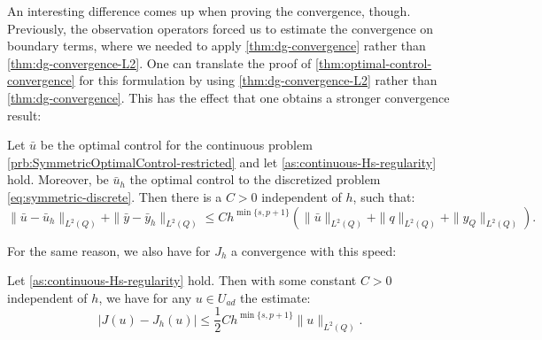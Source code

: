 \documentclass[../thesis.tex]{subfiles}
\begin{document}
An interesting difference comes up when proving the convergence, though. Previously, the observation operators forced us to estimate the convergence on boundary terms, where we needed to apply \cref{thm:dg-convergence} rather than \cref{thm:dg-convergence-L2}. One can translate the proof of \cref{thm:optimal-control-convergence} for this formulation by using \cref{thm:dg-convergence-L2} rather than \cref{thm:dg-convergence}.
This has the effect that one obtains a stronger convergence result:
\begin{theorem}
\label{thm:optimal-control-convergence-symm}
Let $\bar{u}$ be the optimal control for the continuous problem \cref{prb:SymmetricOptimalControl-restricted} and let \cref{as:continuous-Hs-regularity} hold. Moreover, be $\bar{u}_h$ the optimal control to the discretized problem \cref{eq:symmetric-discrete}.
Then there is a $C > 0$ independent of $h$, such that:
\[
	\| \bar{u} - \bar{u}_h \|_{L^2(Q)} + \| \bar{y} - \bar{y}_h \|_{L^2(Q)} \leq C h^{\min \{ s, p+1\}} \left( \| \bar{u} \|_{L^2(Q)} + \| q \|_{L^2(Q)} + \| y_Q \|_{L^2(Q)} \right).
\]
\end{theorem}
For the same reason, we also have for $J_h$ a convergence with this speed:
\begin{lemma}
\label{thm:J-convergence-symm}
Let \cref{as:continuous-Hs-regularity} hold. Then with some constant $C > 0$ independent of $h$, we have for any $u \in U_{ad}$ the estimate:
\[
	| J(u) - J_h(u) | \leq \frac{1}{2} C h^{\min \{ s, p+1\}} \| u \|_{L^2(Q)}.
\]
\end{lemma}
\end{document}
